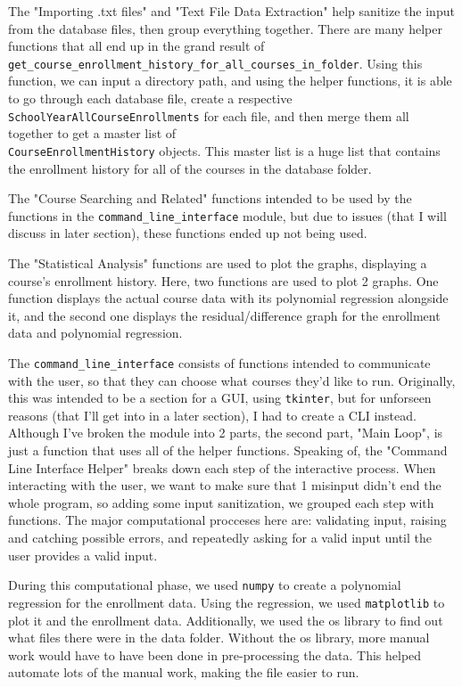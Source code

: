 \documentclass[fontsize=11pt]{article}
\begin{document}
The "Importing .txt files" and "Text File Data Extraction" help sanitize the input from the database files,
then group everything together. There are many helper functions that all end up in the grand result of\\
\texttt{get\_course\_enrollment\_history\_for\_all\_courses\_in\_folder}.
Using this function, we can input a directory path, and using the helper functions, it is able to
go through each database file, create a respective\\ \texttt{SchoolYearAllCourseEnrollments} for each file,
and then merge them all together to get a master list of\\ \texttt{CourseEnrollmentHistory} objects.
This master list is a huge list that contains the enrollment history for all of the courses in the database folder.

The "Course Searching and Related" functions intended to be used by the functions in the \texttt{command\_line\_interface}
module, but due to issues (that I will discuss in later section), these functions ended up not being used.

The "Statistical Analysis" functions are used to plot the graphs, displaying a course's enrollment history.
Here, two functions are used to plot 2 graphs. One function displays the actual course data with its
polynomial regression alongside it, and the second one displays the residual/difference graph for the
enrollment data and polynomial regression.

The \texttt{command\_line\_interface} consists of functions intended to communicate with the user,
so that they can choose what courses they'd like to run.
Originally, this was intended to be a section for a GUI, using \texttt{tkinter}, but for unforseen
reasons (that I'll get into in a later section), I had to create a CLI instead. Although I've broken
the module into 2 parts, the second part, "Main Loop", is just a function that uses all of the
helper functions. Speaking of, the "Command Line Interface Helper" breaks down each step of the
interactive process. When interacting with the user, we want to make sure that 1 misinput didn't
end the whole program, so adding some input sanitization, we grouped each step with functions.
The major computational procceses here are: validating input, raising and catching possible errors,
and repeatedly asking for a valid input until the user provides a valid input.

During this computational phase, we used \texttt{numpy} to create a polynomial regression for the enrollment data.
Using the regression, we used \texttt{matplotlib} to plot it and the enrollment data.
Additionally, we used the os library to find out what files there were in the data folder.
Without the os library, more manual work would have to have been done in pre-processing the data.
This helped automate lots of the manual work, making the file easier to run.
\end{document}
